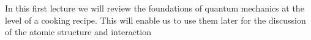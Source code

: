 In this first lecture we will review the foundations of quantum mechanics at the level of a cooking recipe. This will enable us to use them later for the discussion of the atomic structure and interaction 